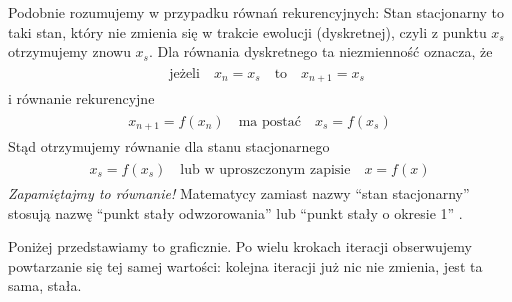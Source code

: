 \documentclass[a4paper,12pt,polish]{sphinxmanual}
\begin{document}
Podobnie rozumujemy w przypadku równań rekurencyjnych:  Stan stacjonarny to taki stan, który nie zmienia się w trakcie ewolucji (dyskretnej), czyli z punktu $x_s$ otrzymujemy znowu $x_s$. Dla równania dyskretnego ta niezmienność oznacza, że
\label{ch1/chI031:equation-eqn9}\begin{gather}
\begin{split}\quad \mbox{jeżeli} \quad x_n = x_s \quad \mbox{to} \quad x_{n+1} = x_s\end{split}\label{ch1/chI031-eqn9}
\end{gather}
i równanie rekurencyjne
\label{ch1/chI031:equation-eqn10}\begin{gather}
\begin{split}x_{n+1} = f(x_n) \quad \mbox{ma postać} \quad x_s = f(x_s)\end{split}\label{ch1/chI031-eqn10}
\end{gather}
Stąd otrzymujemy równanie dla stanu stacjonarnego
\label{ch1/chI031:equation-eqn11}\begin{gather}
\begin{split}x_s = f(x_s) \quad \mbox{lub w uproszczonym zapisie} \quad x=f(x)\end{split}\label{ch1/chI031-eqn11}
\end{gather}
\emph{Zapamiętajmy to równanie!} Matematycy zamiast nazwy ``stan stacjonarny'' stosują nazwę ``punkt stały odwzorowania'' lub ``punkt stały o okresie 1'' .

Poniżej przedstawiamy to graficznie. Po wielu krokach iteracji obserwujemy powtarzanie się tej samej wartości: kolejna iteracji już nic nie zmienia, jest ta sama, stała.
\end{document}
